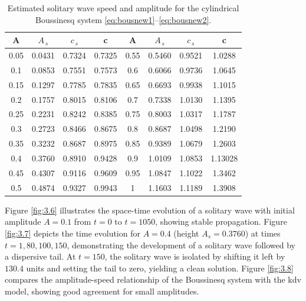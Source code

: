 \documentclass[alpha-refs, 12pt]{wiley-article}
\begin{document}
\begin{table}
  \caption{\label{tab2.2} Estimated solitary wave speed and amplitude for the cylindrical Boussinesq system \eqref{eq:bousnew1}--\eqref{eq:bousnew2}.}
  \begin{center}
  \begin{tabular}{ |c       c       c       c | c       c       c       c | } 
   \hline
    A & $A_{\,s}$ & $c_{\,s}$ & c& A & $A_{\,s}$ & $c_{\,s}$ & c\\
    \hline
   0.05 & 0.0431 & 0.7324 & 0.7325& 0.55 & 0.5460 & 0.9521 & 1.0288 \\
   \hline
   0.1 & 0.0853 & 0.7551& 0.7573 & 0.6 &  0.6066 & 0.9736 & 1.0645\\ 
   \hline
   0.15 &  0.1297 & 0.7785 & 0.7835 & 0.65 & 0.6693 & 0.9938 & 1.1015\\
   \hline
   0.2 & 0.1757 & 0.8015 & 0.8106 & 0.7 &   0.7338 & 1.0130 & 1.1395\\ 
   \hline
   0.25 & 0.2231 & 0.8242 & 0.8385& 0.75 & 0.8003 & 1.0317 & 1.1787 \\
    \hline
   0.3 & 0.2723 & 0.8466 & 0.8675 & 0.8 & 0.8687 & 1.0498 & 1.2190\\
   \hline
   0.35 & 0.3232 & 0.8687 & 0.8975 & 0.85 & 0.9389  & 1.0679 & 1.2603 \\
    \hline
   0.4 &  0.3760 & 0.8910 & 0.9428 & 0.9 & 1.0109 & 1.0853 &1.13028\\
    \hline
    0.45 & 0.4307  & 0.9116 & 0.9609 & 0.95 & 1.0847&1.1022 & 1.3462  \\
    \hline
    0.5 &   0.4874 & 0.9327 & 0.9943 & 1 & 1.1603 & 1.1189 & 1.3908\\
   \hline
  \end{tabular}
  \end{center}
\end{table}

Figure \ref{fig:3.6} illustrates the space-time evolution of a solitary wave with initial amplitude $A = 0.1$ from $t = 0$ to $t = 1050$, showing stable propagation. Figure \ref{fig:3.7} depicts the time evolution for $A = 0.4$ (height $A_s = 0.3760$) at times $t = 1, 80, 100, 150$, demonstrating the development of a solitary wave followed by a dispersive tail. At $t = 150$, the solitary wave is isolated by shifting it left by $130.4$ units and setting the tail to zero, yielding a clean solution. Figure \ref{fig:3.8} compares the amplitude-speed relationship of the Boussinesq system with the \acrshort{kdv} model, showing good agreement for small amplitudes.
\end{document}
